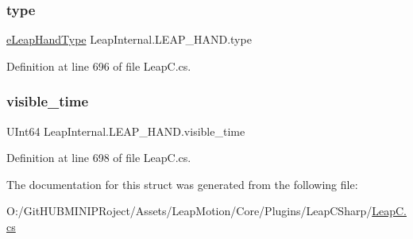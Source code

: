\mbox{\label{struct_leap_internal_1_1_l_e_a_p___h_a_n_d_a8886518627849651eeac8689b5d286d6}} 
\subsubsection{\texorpdfstring{type}{type}}
{\footnotesize\ttfamily \mbox{\hyperlink{namespace_leap_internal_a937dea95e06bb1e2723e0dbb486c9b34}{e\+Leap\+Hand\+Type}} Leap\+Internal.\+L\+E\+A\+P\+\_\+\+H\+A\+N\+D.\+type}



Definition at line 696 of file Leap\+C.\+cs.

\mbox{\label{struct_leap_internal_1_1_l_e_a_p___h_a_n_d_abada54a2c239ed9a4e8954e2a31f956f}} 
\subsubsection{\texorpdfstring{visible\_time}{visible\_time}}
{\footnotesize\ttfamily U\+Int64 Leap\+Internal.\+L\+E\+A\+P\+\_\+\+H\+A\+N\+D.\+visible\+\_\+time}



Definition at line 698 of file Leap\+C.\+cs.



The documentation for this struct was generated from the following file\+:\begin{DoxyCompactItemize}
\item 
O\+:/\+Git\+H\+U\+B\+M\+I\+N\+I\+P\+Roject/\+Assets/\+Leap\+Motion/\+Core/\+Plugins/\+Leap\+C\+Sharp/\mbox{\hyperlink{_leap_c_8cs}{Leap\+C.\+cs}}\end{DoxyCompactItemize}
